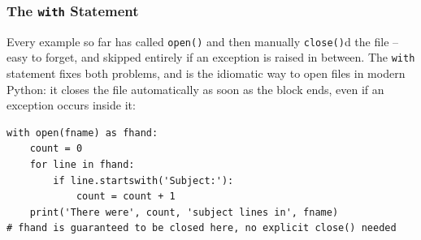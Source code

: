 \begin{frame}[fragile]\frametitle{The \texttt{with} Statement}
Every example so far has called \lstinline|open()| and then manually \lstinline|close()|d the
file -- easy to forget, and skipped entirely if an exception is raised in between. The
\texttt{with} statement fixes both problems, and is the idiomatic way to open files in modern
Python: it closes the file automatically as soon as the block ends, even if an exception occurs
inside it:
\begin{lstlisting}
with open(fname) as fhand:
    count = 0
    for line in fhand:
        if line.startswith('Subject:'):
            count = count + 1
    print('There were', count, 'subject lines in', fname)
# fhand is guaranteed to be closed here, no explicit close() needed
\end{lstlisting}
\end{frame}

